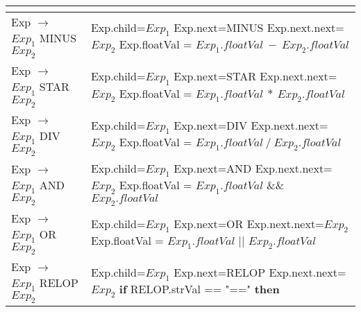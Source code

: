 \documentclass[UTF8,11pt,a4paper]{ctexart}%
\begin{document}
\begin{center}
\begin{longtable}{l|l}
{        }\\
        \hline
        Exp $\rightarrow $ $Exp_1$ MINUS $Exp_2$ & \makecell[l]{
            Exp.child=$Exp_1$\\
            Exp.next=MINUS\\
            Exp.next.next=$Exp_2$\\
            Exp.floatVal = $Exp_1.floatVal\ - \ Exp_2.floatVal$
        }\\
        \hline
        Exp $\rightarrow $ $Exp_1$ STAR $Exp_2$ & \makecell[l]{
            Exp.child=$Exp_1$\\
            Exp.next=STAR\\
            Exp.next.next=$Exp_2$\\
            Exp.floatVal = $Exp_1.floatVal\ * \ Exp_2.floatVal$
        }\\
        \hline
        Exp $\rightarrow $ $Exp_1$ DIV $Exp_2$ & \makecell[l]{
            Exp.child=$Exp_1$\\
            Exp.next=DIV\\
            Exp.next.next=$Exp_2$\\
            Exp.floatVal = $Exp_1.floatVal\ / \ Exp_2.floatVal$
        }\\
        \hline 
        Exp $\rightarrow $ $Exp_1$ AND $Exp_2$ & \makecell[l]{
            Exp.child=$Exp_1$\\
            Exp.next=AND\\
            Exp.next.next=$Exp_2$\\
            Exp.floatVal = $Exp_1.floatVal$ \&\& $Exp_2.floatVal$
        }\\
        \hline 
        Exp $\rightarrow $ $Exp_1$ OR $Exp_2$ & \makecell[l]{
            Exp.child=$Exp_1$\\
            Exp.next=OR\\
            Exp.next.next=$Exp_2$\\
            Exp.floatVal = $Exp_1.floatVal$ || $Exp_2.floatVal$\\
        }\\
        \hline 
        Exp $\rightarrow $ $Exp_1$ RELOP $Exp_2$ & \makecell[l]{
            Exp.child=$Exp_1$\\
            Exp.next=RELOP\\
            Exp.next.next=$Exp_2$\\
            \textbf{if} RELOP.strVal == "=="\\
            \textbf{then} \\
}
\end{longtable}
\end{center}
\end{document}
